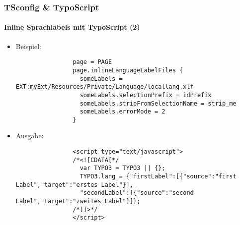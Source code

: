 \begin{frame}[fragile]
	\frametitle{TSconfig \& TypoScript}
	\framesubtitle{Inline Sprachlabels mit TypoScript (2)}

	\lstset{basicstyle=\tiny\ttfamily}

	\begin{itemize}

		\item Beispiel:

			\begin{lstlisting}
				page = PAGE
				page.inlineLanguageLabelFiles {
				  someLabels = EXT:myExt/Resources/Private/Language/locallang.xlf
				  someLabels.selectionPrefix = idPrefix
				  someLabels.stripFromSelectionName = strip_me
				  someLabels.errorMode = 2
				}
			\end{lstlisting}

		\item Ausgabe:

			\begin{lstlisting}
				<script type="text/javascript">
				/*<![CDATA[*/
				  var TYPO3 = TYPO3 || {};
				  TYPO3.lang = {"firstLabel":[{"source":"first Label","target":"erstes Label"}],
				  "secondLabel":[{"source":"second Label","target":"zweites Label"}]};
				/*]]>*/
				</script>
			\end{lstlisting}

	\end{itemize}

\end{frame}

